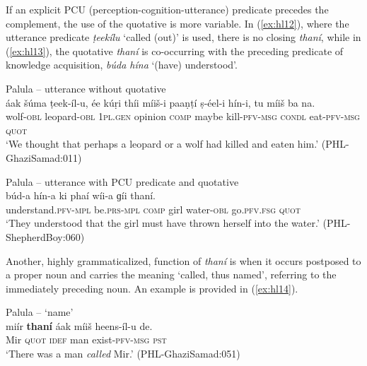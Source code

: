 \documentclass[output=paper]{langsci/langscibook}
\begin{document}
If an explicit PCU (perception-cognition-utterance) predicate precedes the complement, the use of the quotative is more variable. In ‎(\ref{ex:hl12}), where the utterance predicate \textit{ṭeekílu} ‘called (out)’ is used, there is no closing \textit{thaní}, while in ‎(\ref{ex:hl13}), the quotative \textit{thaní} is co-occurring with the preceding predicate of knowledge acquisition, \textit{búda hína} ‘(have) understood’.

\begin{exe}
	\ex Palula -- utterance without quotative \label{ex:hl12}\\
	\gll áak šúma ṭeek-íl-u, ée kúṛi thíi míiš-i paaṇṭí ṣ-éel-i hín-i, tu míiš ba na.\\
	wolf-\textsc{obl} leopard-\textsc{obl} 1\textsc{pl}.\textsc{gen} opinion \textsc{comp} maybe kill-\textsc{pfv}-\textsc{msg} \textsc{condl} eat-\textsc{pfv}-\textsc{msg} \textsc{quot}\\
	\trans ‘We thought that perhaps a leopard or a wolf had killed and eaten him.’ (PHL-GhaziSamad:011)
\end{exe}

\begin{exe}
	\ex Palula -- utterance with PCU predicate and quotative \label{ex:hl13}\\
	\gll búd-a hín-a ki phaí wíi-a ɡíi thaní.\\
	understand.\textsc{pfv}-\textsc{mpl}  be.\textsc{prs}-\textsc{mpl} \textsc{comp} girl water-\textsc{obl} go.\textsc{pfv}.\textsc{fsg} \textsc{quot}\\
	\trans ‘They understood that the girl must have thrown herself into the water.’ (PHL-ShepherdBoy:060)
\end{exe}


Another, highly grammaticalized, function of \textit{thaní} is when it occurs postposed to a proper noun and carries the meaning ‘called, thus named’, referring to the immediately preceding noun. An example is provided in ‎(\ref{ex:hl14}).


\begin{exe}
	\ex Palula -- `name' \label{ex:hl14}\\
	\gll miír \textbf{thaní} áak míiš heens-íl-u de.\\
	Mir \textsc{quot} \textsc{idef} man exist-\textsc{pfv}-\textsc{msg} \textsc{pst}\\
	\trans ‘There was a man \textit{called} Mir.’ (PHL-GhaziSamad:051)
\end{exe}
\end{document}

